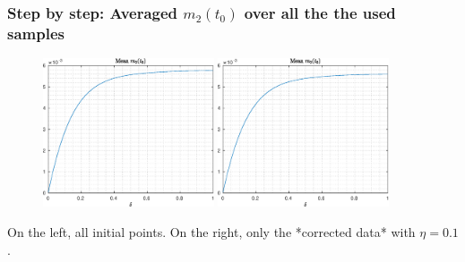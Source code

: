 \documentclass[aspectratio=169]{beamer}\usepackage[utf8]{inputenc}
\begin{document}
\begin{frame}\frametitle{Step by step: Averaged $m_2(t_0)$ over all the the used samples}

\begin{figure}[ht!]
\centering
\includegraphics[width=0.45\textwidth]{../../MATLAB_Files/Results/delta/M2_0.eps}
\includegraphics[width=0.45\textwidth]{../../MATLAB_Files/Results/delta/M2_1.eps}
\end{figure}
On the left, all initial points. On the right, only the {\color{orange}*corrected data* with $\eta=0.1$}.
\end{frame}
\end{document}
